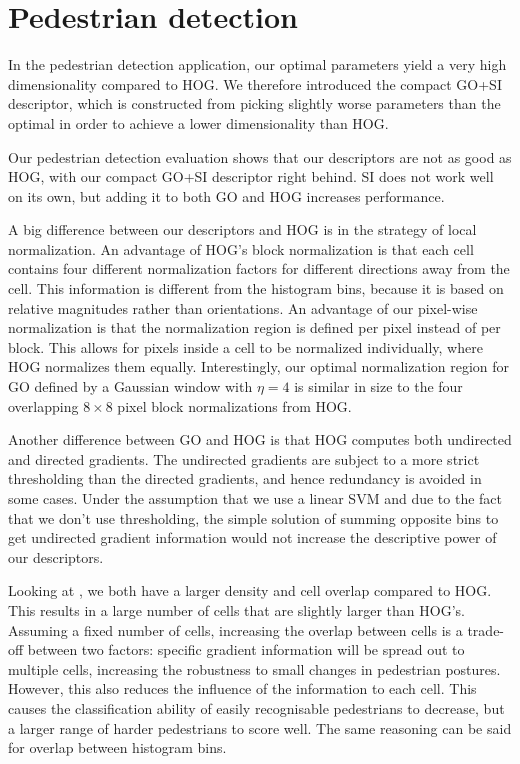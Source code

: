\documentclass[thesis.tex]{subfiles}
\begin{document}
\section{Pedestrian detection}
\label{sec:discussionOd}
In the pedestrian detection application, our optimal parameters yield a very high dimensionality compared to HOG. We therefore introduced the compact GO+SI descriptor, which is constructed from picking slightly worse parameters than the optimal in order to achieve a lower dimensionality than HOG.

Our pedestrian detection evaluation shows that our descriptors are not as good as HOG, with our compact GO+SI descriptor right behind. SI does not work well on its own, but adding it to both GO and HOG increases performance.

A big difference between our descriptors and HOG is in the strategy of local normalization. An advantage of HOG's block normalization is that each cell contains four different normalization factors for different directions away from the cell. This information is different from the histogram bins, because it is based on relative magnitudes rather than orientations. An advantage of our pixel-wise normalization is that the normalization region is defined per pixel instead of per block. This allows for pixels inside a cell to be normalized individually, where HOG normalizes them equally. Interestingly, our optimal normalization region for GO defined by a Gaussian window with $\eta = 4$ is similar in size to the four overlapping $8 \times 8$ pixel block normalizations from HOG.

Another difference between GO and HOG is that HOG computes both undirected and directed gradients. The undirected gradients are subject to a more strict thresholding than the directed gradients, and hence redundancy is avoided in some cases. Under the assumption that we use a linear SVM and due to the fact that we don't use thresholding, the simple solution of summing opposite bins to get undirected gradient information would not increase the descriptive power of our descriptors.

Looking at , we both have a larger density and cell overlap compared to HOG. This results in a large number of cells that are slightly larger than HOG's. Assuming a fixed number of cells, increasing the overlap between cells is a trade-off between two factors: specific gradient information will be spread out to multiple cells, increasing the robustness to small changes in pedestrian postures. However, this also reduces the influence of the information to each cell. This causes the classification ability of easily recognisable pedestrians to decrease, but a larger range of harder pedestrians to score well. The same reasoning can be said for overlap between histogram bins.
\end{document}
